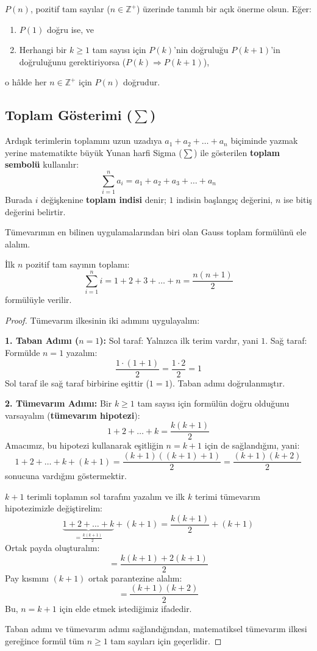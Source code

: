 \begin{theorem}
$P(n)$, pozitif tam sayılar ($n \in \mathbb{Z}^+$) üzerinde tanımlı bir açık önerme olsun. Eğer:
\begin{enumerate}
  \item $P(1)$ doğru ise, ve
  \item Herhangi bir $k \ge 1$ tam sayısı için $P(k)$'nin doğruluğu $P(k+1)$'in doğruluğunu gerektiriyorsa ($P(k) \Rightarrow P(k+1)$),
\end{enumerate}
o hâlde her $n \in \mathbb{Z}^+$ için $P(n)$ doğrudur.
\end{theorem}

\subsection{Toplam Gösterimi ($\sum$)}

Ardışık terimlerin toplamını uzun uzadıya $a_1 + a_2 + \dots + a_n$ biçiminde yazmak yerine matematikte büyük Yunan harfi Sigma ($\sum$) ile gösterilen \textbf{toplam sembolü} kullanılır:
\[ \sum_{i=1}^n a_i = a_1 + a_2 + a_3 + \dots + a_n \]
Burada $i$ değişkenine \textbf{toplam indisi} denir; $1$ indisin başlangıç değerini, $n$ ise bitiş değerini belirtir.

Tümevarımın en bilinen uygulamalarından biri olan Gauss toplam formülünü ele alalım.

\begin{theorem}
İlk $n$ pozitif tam sayının toplamı:
\[ \sum_{i=1}^n i = 1 + 2 + 3 + \dots + n = \frac{n(n+1)}{2} \]
formülüyle verilir.
\end{theorem}
\begin{proof}
Tümevarım ilkesinin iki adımını uygulayalım:

\textbf{1. Taban Adımı ($n = 1$):}
Sol taraf: Yalnızca ilk terim vardır, yani $1$.
Sağ taraf: Formülde $n = 1$ yazalım:
\[ \frac{1 \cdot (1 + 1)}{2} = \frac{1 \cdot 2}{2} = 1 \]
Sol taraf ile sağ taraf birbirine eşittir ($1 = 1$). Taban adımı doğrulanmıştır.

\textbf{2. Tümevarım Adımı:}
Bir $k \ge 1$ tam sayısı için formülün doğru olduğunu varsayalım (\textbf{tümevarım hipotezi}):
\[ 1 + 2 + \dots + k = \frac{k(k+1)}{2} \]
Amacımız, bu hipotezi kullanarak eşitliğin $n = k+1$ için de sağlandığını, yani:
\[ 1 + 2 + \dots + k + (k+1) = \frac{(k+1)((k+1)+1)}{2} = \frac{(k+1)(k+2)}{2} \]
sonucuna vardığını göstermektir.

$k+1$ terimli toplamın sol tarafını yazalım ve ilk $k$ terimi tümevarım hipotezimizle değiştirelim:
\[ \underbrace{1 + 2 + \dots + k}_{= \frac{k(k+1)}{2}} + (k+1) = \frac{k(k+1)}{2} + (k+1) \]
Ortak payda oluşturalım:
\[ = \frac{k(k+1) + 2(k+1)}{2} \]
Pay kısmını $(k+1)$ ortak parantezine alalım:
\[ = \frac{(k+1)(k+2)}{2} \]
Bu, $n = k+1$ için elde etmek istediğimiz ifadedir.

Taban adımı ve tümevarım adımı sağlandığından, matematiksel tümevarım ilkesi gereğince formül tüm $n \ge 1$ tam sayıları için geçerlidir.
\end{proof}

